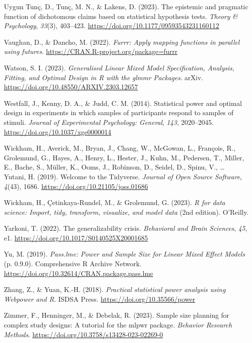 \documentclass[
  man,
  floatsintext,
  longtable,
  a4paper,
  nolmodern,
  notxfonts,
  notimes,
  colorlinks=true,linkcolor=blue,citecolor=blue,urlcolor=blue]{apa7}
\newlength{\cslhangindent}
\newenvironment{CSLReferences}[2] %
 {\begin{list}{}{%
  \setlength{\itemindent}{0pt}
  \setlength{\leftmargin}{0pt}
  \setlength{\parsep}{0pt}
  \ifodd #1
   \setlength{\leftmargin}{\cslhangindent}
   \setlength{\itemindent}{-1\cslhangindent}
  \fi
  \setlength{\itemsep}{#2\baselineskip}}}
 {\end{list}}
\begin{document}
\begin{CSLReferences}{1}{0}
Uygun Tunç, D., Tunç, M. N., \& Lakens, D. (2023). The epistemic and
pragmatic function of dichotomous claims based on statistical hypothesis
tests. \emph{Theory \& Psychology}, \emph{33}(3), 403--423.
\url{https://doi.org/10.1177/09593543231160112}

Vaughan, D., \& Dancho, M. (2022). \emph{Furrr: Apply mapping functions
in parallel using futures}.
\url{https://CRAN.R-project.org/package=furrr}

Watson, S. I. (2023). \emph{Generalised {Linear Mixed Model
Specification}, {Analysis}, {Fitting}, and {Optimal Design} in {R} with
the glmmr {Packages}}. arXiv.
\url{https://doi.org/10.48550/ARXIV.2303.12657}

Westfall, J., Kenny, D. A., \& Judd, C. M. (2014). Statistical power and
optimal design in experiments in which samples of participants respond
to samples of stimuli. \emph{Journal of Experimental Psychology:
General}, \emph{143}, 2020--2045.
\url{https://doi.org/10.1037/xge0000014}

Wickham, H., Averick, M., Bryan, J., Chang, W., McGowan, L., François,
R., Grolemund, G., Hayes, A., Henry, L., Hester, J., Kuhn, M., Pedersen,
T., Miller, E., Bache, S., Müller, K., Ooms, J., Robinson, D., Seidel,
D., Spinu, V., \ldots{} Yutani, H. (2019). Welcome to the {Tidyverse}.
\emph{Journal of Open Source Software}, \emph{4}(43), 1686.
\url{https://doi.org/10.21105/joss.01686}

Wickham, H., Çetinkaya-Rundel, M., \& Grolemund, G. (2023). \emph{R for
data science: Import, tidy, transform, visualize, and model data} (2nd
edition). O'Reilly.

Yarkoni, T. (2022). The generalizability crisis. \emph{Behavioral and
Brain Sciences}, \emph{45}, e1.
\url{https://doi.org/10.1017/S0140525X20001685}

Yu, M. (2019). \emph{Pass.lme: {Power} and {Sample Size} for {Linear
Mixed Effect Models}} (p. 0.9.0). Comprehensive R Archive Network.
\url{https://doi.org/10.32614/CRAN.package.pass.lme}

Zhang, Z., \& Yuan, K.-H. (2018). \emph{Practical statistical power
analysis using {Webpower} and {R}}. ISDSA Press.
\url{https://doi.org/10.35566/power}

Zimmer, F., Henninger, M., \& Debelak, R. (2023). Sample size planning
for complex study designs: {A} tutorial for the mlpwr package.
\emph{Behavior Research Methods}.
\url{https://doi.org/10.3758/s13428-023-02269-0}

\end{CSLReferences}
\end{document}
